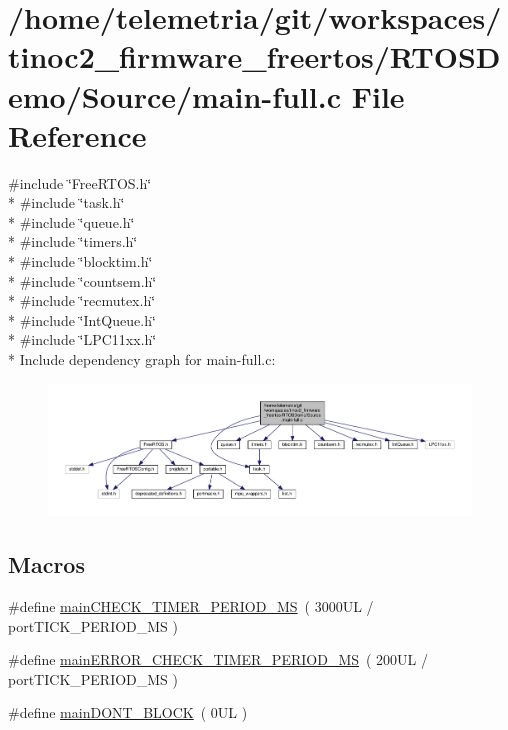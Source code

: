 \hypertarget{main-full_8c}{}\section{/home/telemetria/git/workspaces/tinoc2\+\_\+firmware\+\_\+freertos/\+R\+T\+O\+S\+Demo/\+Source/main-\/full.c File Reference}
\label{main-full_8c}
{\ttfamily \#include \char`\"{}Free\+R\+T\+O\+S.\+h\char`\"{}}\\*
{\ttfamily \#include \char`\"{}task.\+h\char`\"{}}\\*
{\ttfamily \#include \char`\"{}queue.\+h\char`\"{}}\\*
{\ttfamily \#include \char`\"{}timers.\+h\char`\"{}}\\*
{\ttfamily \#include \char`\"{}blocktim.\+h\char`\"{}}\\*
{\ttfamily \#include \char`\"{}countsem.\+h\char`\"{}}\\*
{\ttfamily \#include \char`\"{}recmutex.\+h\char`\"{}}\\*
{\ttfamily \#include \char`\"{}Int\+Queue.\+h\char`\"{}}\\*
{\ttfamily \#include \char`\"{}L\+P\+C11xx.\+h\char`\"{}}\\*
Include dependency graph for main-\/full.c\+:
\nopagebreak
\begin{figure}[H]
\begin{center}
\leavevmode
\includegraphics[width=350pt]{main-full_8c__incl}
\end{center}
\end{figure}
\subsection*{Macros}
\begin{DoxyCompactItemize}
\item 
\#define \hyperlink{main-full_8c_afa612487486b4303046802549315dbb7}{main\+C\+H\+E\+C\+K\+\_\+\+T\+I\+M\+E\+R\+\_\+\+P\+E\+R\+I\+O\+D\+\_\+\+MS}~( 3000\+U\+L / port\+T\+I\+C\+K\+\_\+\+P\+E\+R\+I\+O\+D\+\_\+\+M\+S )
\item 
\#define \hyperlink{main-full_8c_a4c0b5798e5d44e143dda2bdb409320cf}{main\+E\+R\+R\+O\+R\+\_\+\+C\+H\+E\+C\+K\+\_\+\+T\+I\+M\+E\+R\+\_\+\+P\+E\+R\+I\+O\+D\+\_\+\+MS}~( 200\+U\+L / port\+T\+I\+C\+K\+\_\+\+P\+E\+R\+I\+O\+D\+\_\+\+M\+S )
\item 
\#define \hyperlink{main-full_8c_a3f3e783c201b1a805260b70df9dc6c68}{main\+D\+O\+N\+T\+\_\+\+B\+L\+O\+CK}~( 0\+U\+L )
\end{DoxyCompactItemize}
